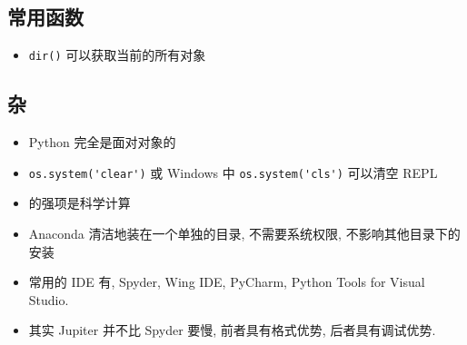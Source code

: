 \subsection{常用函数}
\begin{itemize}
\item \verb`dir()` 可以获取当前的所有对象
\end{itemize}

\subsection{杂}
\begin{itemize}
\item Python 完全是面对对象的
\item \verb`os.system('clear')` 或 Windows 中 \verb`os.system('cls')` 可以清空 REPL
\item {} 的强项是科学计算
\item Anaconda 清洁地装在一个单独的目录, 不需要系统权限, 不影响其他目录下的安装
\item 常用的 IDE 有, Spyder, Wing IDE, PyCharm, Python Tools for Visual Studio.
\item 其实 Jupiter 并不比 Spyder 要慢, 前者具有格式优势, 后者具有调试优势.
\end{itemize}
